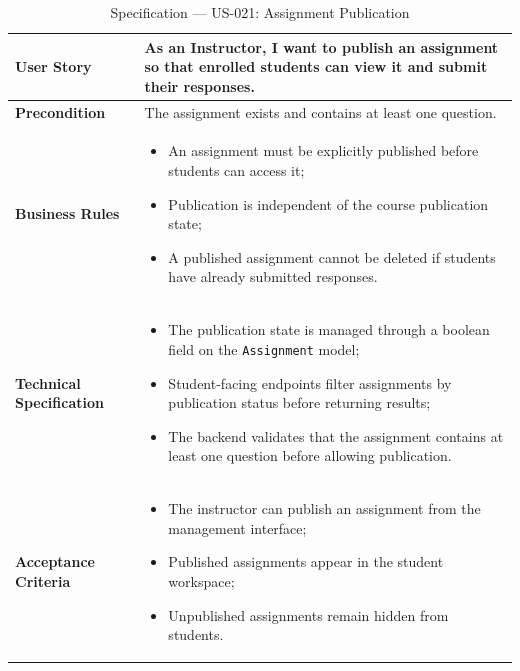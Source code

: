 \begin{table}[H]
\centering
\caption{Specification — US-021: Assignment Publication}
\label{tab:us021}
\renewcommand{\arraystretch}{1.2}
\begin{tabularx}{\textwidth}{|p{3.5cm}|X|}
\hline
\textbf{User Story} & As an Instructor, I want to publish an assignment so that enrolled students can view it and submit their responses. \\
\hline
\textbf{Precondition} & The assignment exists and contains at least one question. \\
\hline
\textbf{Business Rules} &
\begin{itemize}[noitemsep, topsep=2pt]
  \item An assignment must be explicitly published before students can access it;
  \item Publication is independent of the course publication state;
  \item A published assignment cannot be deleted if students have already submitted responses.
\end{itemize} \\
\hline
\textbf{Technical Specification} &
\begin{itemize}[noitemsep, topsep=2pt]
  \item The publication state is managed through a boolean field on the \texttt{Assignment} model;
  \item Student-facing endpoints filter assignments by publication status before returning results;
  \item The backend validates that the assignment contains at least one question before allowing publication.
\end{itemize} \\
\hline
\textbf{Acceptance Criteria} &
\begin{itemize}[noitemsep, topsep=2pt]
  \item The instructor can publish an assignment from the management interface;
  \item Published assignments appear in the student workspace;
  \item Unpublished assignments remain hidden from students.
\end{itemize} \\
\hline
\end{tabularx}
\end{table}

